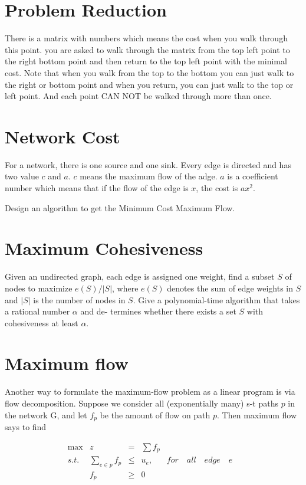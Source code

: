 \documentclass[a4paper,11pt]{article}
\begin{document}
\section{Problem Reduction}
\noindent
There is a matrix with numbers which means the cost when you walk through this point.
you are asked to walk through the matrix from the top left point to the right bottom point and then return to the top left point with the minimal cost.
Note that when you walk from the top to the bottom you can just walk to the right or bottom point and when you return, you can just walk to the top or left point. And each point 
CAN NOT be walked through more than once.  

\section{Network Cost}
\noindent
For a network, there is one source and one sink. Every edge is directed and has two value $c$ and $a$. $c$ means the maximum flow of the adge. $a$ is a coefficient number which means that if the flow of the edge is $x$, the cost is $ax^2$.

Design an algorithm to get the Minimum Cost Maximum Flow.

\section{Maximum Cohesiveness}
\noindent
Given an undirected graph, each edge is assigned one weight, find a subset $S$ of
nodes to maximize $e(S)/|S|$, where $e(S)$ denotes the sum of edge weights in $S$
and $|S|$ is the number of nodes in $S$.
Give a polynomial-time algorithm that takes a rational number $\alpha$ and de-
termines whether there exists a set $S$ with cohesiveness at least $\alpha$.


\section{Maximum flow}
\noindent
Another way to formulate the maximum-flow problem as a linear program is via flow decomposition. Suppose we consider all (exponentially many) s-t paths $p$ in the network G, and let $f_p$ be the amount of flow on path $p$. Then maximum flow says to find

\[
\begin{array}{rrrrrr}
 \max & z & = &\sum{f_p}   & & \\
 s.t. &  \sum_{e \in p}f_p  & \leq & u_e ,& for \quad all \quad edge \quad e &   \\
      & f_p  & \geq & 0  & &  \\
\end{array} \nonumber
\]
\end{document}
